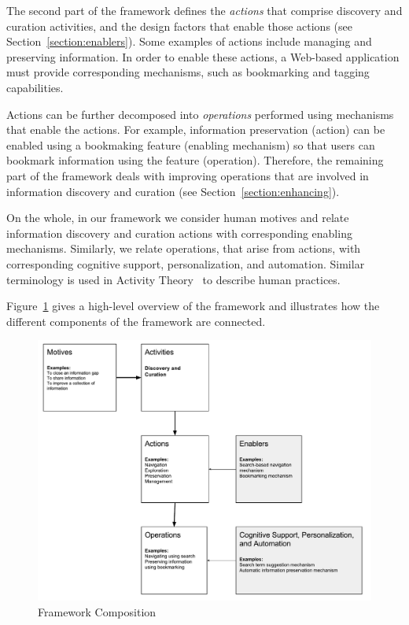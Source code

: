 \documentclass{sigchi}
\begin{document}
{The second part of the framework defines the \textit{actions} that comprise discovery and curation activities, and the design factors that enable those actions (see Section~\ref{section:enablers}). Some examples of actions include managing and preserving information. In order to enable these actions, a Web-based application must provide corresponding mechanisms, such as bookmarking and tagging capabilities.

Actions can be further decomposed into \textit{operations} performed using mechanisms that enable the actions. For example, information preservation (action) can be enabled using a bookmaking feature (enabling mechanism) so that users can bookmark information using the feature (operation). Therefore, the remaining part of the framework deals with improving operations that are involved in information discovery and curation (see Section~\ref{section:enhancing}).  

On the whole, in our framework we consider human motives and relate information discovery and curation actions with corresponding enabling mechanisms. Similarly, we relate operations, that arise from actions, with corresponding cognitive support, personalization, and automation.  Similar terminology is used in Activity Theory~\cite{kuutti1996activity} to describe human practices. 

Figure~\ref{fig:framework_overview} gives a high-level overview of the framework and illustrates how the different components of the framework are connected.



\begin{figure}[ht!]
	\noindent
	\centering
    \includegraphics[width=\linewidth]{figures/framework_overview.pdf}
	\caption{Framework Composition}
	\label{fig:framework_overview} 
\end{figure}


}
\end{document}
